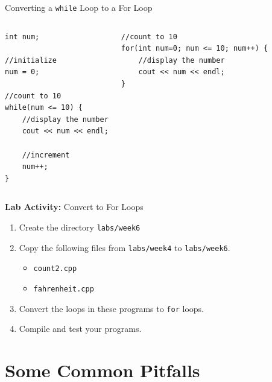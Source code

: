 \documentclass[]{beamer}
\begin{document}
\begin{frame}[fragile]{Converting a \texttt{while} Loop to a For Loop}
\begin{columns}
    \begin{adjustbox}{max width=\textwidth}
    \begin{BVerbatim}
int num;

//initialize
num = 0;

//count to 10
while(num <= 10) {
    //display the number
    cout << num << endl;

    //increment
    num++;
}
    \end{BVerbatim}
    \end{adjustbox}

    \begin{adjustbox}{max width=\textwidth}
    \begin{BVerbatim}
//count to 10
for(int num=0; num <= 10; num++) {
    //display the number
    cout << num << endl;
}
    \end{BVerbatim}
    \end{adjustbox}
\end{columns}
\end{frame}

\begin{frame}{\textbf{Lab Activity:} Convert to For Loops}
    \begin{enumerate}
        \item Create the directory \texttt{labs/week6}
        \item Copy the following files from \texttt{labs/week4} to
            \texttt{labs/week6}.
            \begin{itemize}
                \item \texttt{count2.cpp}
                \item \texttt{fahrenheit.cpp}
            \end{itemize}
        \item Convert the loops in these programs to \texttt{for}
            loops.
        \item Compile and test your programs.
    \end{enumerate}
\end{frame}

\section{Some Common Pitfalls}
\end{document}
